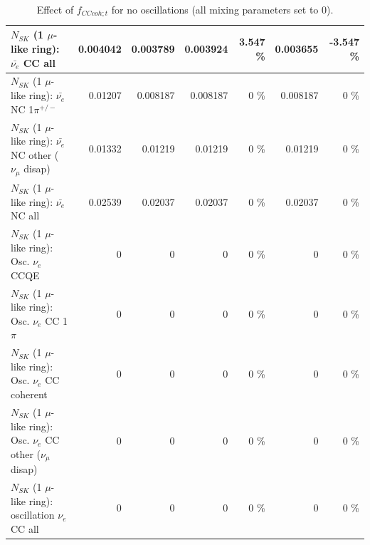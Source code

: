 \begin{table}
\begin{tabular}{| l | r | r | r  r | r  r |}
                            $N_{SK}$ (1 $\mu$-like ring): $\bar{\nu_{e}}$ CC all &        0.004042 &        0.003789 &        0.003924 &    3.547 \%  &        0.003655 &   -3.547 \%  \\ 
\hline
                     $N_{SK}$ (1 $\mu$-like ring): $\bar{\nu_e}$ NC 1$\pi^{+/-}$ &         0.01207 &        0.008187 &        0.008187 &        0 \%  &        0.008187 &        0 \%  \\ 
          $N_{SK}$ (1 $\mu$-like ring): $\bar{\nu_e}$ NC other ($\nu_\mu$ disap) &         0.01332 &         0.01219 &         0.01219 &        0 \%  &         0.01219 &        0 \%  \\ 
                            $N_{SK}$ (1 $\mu$-like ring): $\bar{\nu_{e}}$ NC all &         0.02539 &         0.02037 &         0.02037 &        0 \%  &         0.02037 &        0 \%  \\ 
\hline
\hline
\hline
                                 $N_{SK}$ (1 $\mu$-like ring): Osc. $\nu_e$ CCQE &               0 &               0 &               0 &        0 \%  &               0 &        0 \%  \\ 
                            $N_{SK}$ (1 $\mu$-like ring): Osc. $\nu_e$ CC 1$\pi$ &               0 &               0 &               0 &        0 \%  &               0 &        0 \%  \\ 
                          $N_{SK}$ (1 $\mu$-like ring): Osc. $\nu_e$ CC coherent &               0 &               0 &               0 &        0 \%  &               0 &        0 \%  \\ 
           $N_{SK}$ (1 $\mu$-like ring): Osc. $\nu_e$ CC other ($\nu_\mu$ disap) &               0 &               0 &               0 &        0 \%  &               0 &        0 \%  \\ 
                        $N_{SK}$ (1 $\mu$-like ring): oscillation $\nu_e$ CC all &               0 &               0 &               0 &        0 \%  &               0 &        0 \%  \\ 
\hline
\hline
\end{tabular}
\caption{ Effect of $f_{CCcoh; t}$ for no oscillations (all mixing parameters set to 0). }
\label{tab:num_xsec_norm_cccoh_1RmuT_3f_osc_t13:0}
\end{table}
\clearpage
